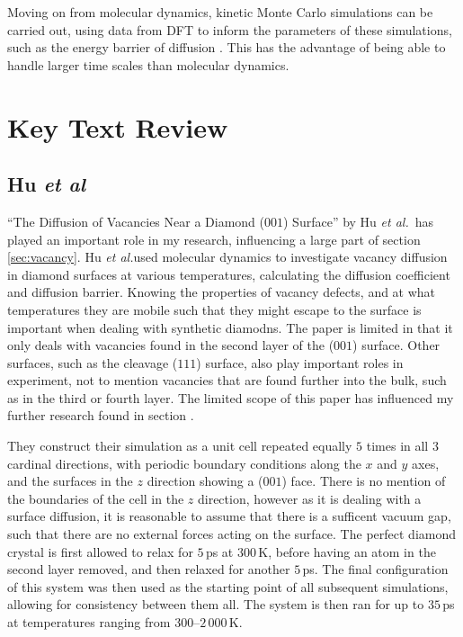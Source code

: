 \documentclass[10pt,a4paper,twocolumn,twoside]{extarticle}
\newcommand{\al}{\emph{et al.}}
\begin{document}
Moving on from molecular dynamics, kinetic Monte Carlo simulations can be carried out, using data from DFT to inform the parameters of these simulations, such as the energy barrier of diffusion \cite{radiation_modelling}. This has the advantage of being able to handle larger time scales than molecular dynamics.



\section{Key Text Review}
\subsection{Hu \textit{et al}}
\label{Hu}
``The Diffusion of Vacancies Near a Diamond ($001$) Surface'' by Hu \al~has played an important role in my research, influencing a large part of section \ref{sec:vacancy}. Hu \al used molecular dynamics to investigate vacancy diffusion in diamond surfaces at various temperatures, calculating the diffusion coefficient and diffusion barrier. Knowing the properties of vacancy defects, and at what temperatures they are mobile such that they might escape to the surface is important when dealing with synthetic diamodns. The paper is limited in that it only deals with vacancies found in the second layer of the ($001$) surface. Other surfaces, such as the cleavage ($111$) surface, also play important roles in experiment, not to mention vacancies that are found further into the bulk, such as in the third or fourth layer. The limited scope of this paper has influenced my further research found in section .

They construct their simulation as a unit cell repeated equally $5$ times in all $3$ cardinal directions, with periodic boundary conditions along the $x$ and $y$ axes, and the surfaces in the $z$ direction showing a ($001$) face. There is no mention of the boundaries of the cell in the $z$ direction, however as it is dealing with a surface diffusion, it is reasonable to assume that there is a sufficent vacuum gap, such that there are no external forces acting on the surface. The perfect diamond crystal is first allowed to relax for $5$\,ps at $300$\,K, before having an atom in the second layer removed, and then relaxed for another $5$\,ps. The final configuration of this system was then used as the starting point of all subsequent simulations, allowing for consistency between them all. The system is then ran for up to $35$\,ps at temperatures ranging from $300$--$2\,000$\,K. 
\end{document}
